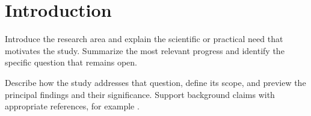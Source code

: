 \section{Introduction}

Introduce the research area and explain the scientific or practical need that
motivates the study. Summarize the most relevant progress and identify the
specific question that remains open.

Describe how the study addresses that question, define its scope, and preview
the principal findings and their significance. Support background claims with
appropriate references, for example \cite{lamport1994latex}.

